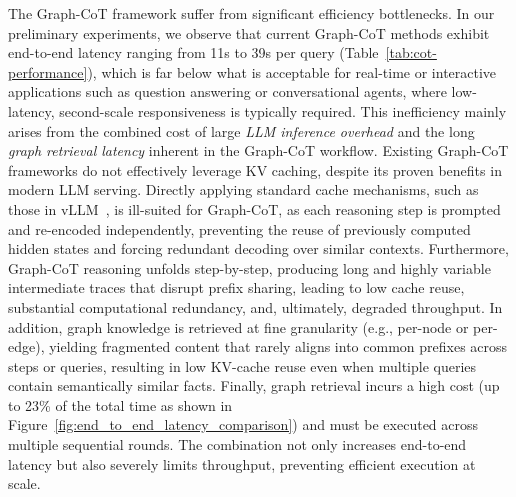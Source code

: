 

%
The Graph-CoT framework suffer from significant efficiency bottlenecks. In our preliminary experiments, we observe that current Graph-CoT methods exhibit end-to-end latency ranging from 11s to 39s per query (Table~\ref{tab:cot-performance}), which is far below what is acceptable for real-time or interactive applications such as question answering or conversational agents, where low-latency, second-scale responsiveness is typically required. This inefficiency mainly arises from the combined cost of large \textit{LLM inference overhead} and the long \textit{graph retrieval latency} inherent in the Graph-CoT workflow. 
%
 Existing Graph-CoT frameworks do not effectively leverage KV caching, despite its proven benefits in modern LLM serving. Directly applying standard cache mechanisms, such as those in vLLM~\cite{kwon2023efficient}, is ill-suited for Graph-CoT, as each reasoning step is prompted and re-encoded independently, preventing the reuse of previously computed hidden states and forcing redundant decoding over similar contexts. 
%
Furthermore, Graph-CoT reasoning unfolds step-by-step, producing long and highly variable intermediate traces that disrupt prefix sharing, leading to low cache reuse, substantial computational redundancy, and, ultimately, degraded throughput. 
%
In addition, graph knowledge is retrieved at fine granularity (e.g., per-node or per-edge), yielding fragmented content that rarely aligns into common prefixes across steps or queries, resulting in low KV-cache reuse even when multiple queries contain semantically similar facts. 
%
Finally, graph retrieval incurs a high cost (up to 23\% of the total time as shown in Figure~\ref{fig:end_to_end_latency_comparison}) and must be executed across multiple sequential rounds. The combination not only increases end-to-end latency but also severely limits throughput, preventing efficient execution at scale.

